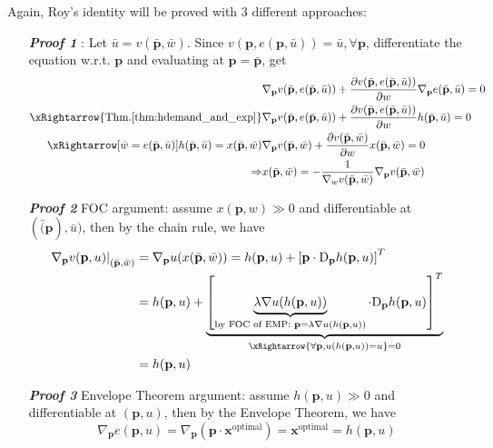 Again, Roy's identity will be proved with 3 different approaches:
\begin{enumerate}
    \item[\textit{\textbf{Proof 1}}]: Let $\bar{u} = v(\bar{\mathbf{p}},\bar{w})$. Since $v(\mathbf{p},e(\mathbf{p},\bar{u}))=\bar{u},\forall \mathbf{p}$, differentiate the equation w.r.t. $\mathbf{p}$ and evaluating at $\mathbf{p}=\bar{\mathbf{p}}$, get
    \begin{align*}
        & \nabla_{\mathbf{p}} v(\bar{\mathbf{p}},e(\bar{\mathbf{p}},\bar{u})) + \frac{\partial v(\bar{\mathbf{p}},e(\bar{\mathbf{p}},\bar{u}))}{\partial w} \nabla_{\mathbf{p}}e(\bar{\mathbf{p}},\bar{u})=0 \\
        \xRightarrow{\text{Thm.\ref{thm:hdemand_and_exp}}} & \nabla_{\mathbf{p}} v(\bar{\mathbf{p}},e(\bar{\mathbf{p}},\bar{u})) + \frac{\partial v(\bar{\mathbf{p}},e(\bar{\mathbf{p}},\bar{u}))}{\partial w} h(\bar{\mathbf{p}},\bar{u})=0\\
        \xRightarrow[\bar{w}=e(\bar{\mathbf{p}},\bar{u})]{h(\bar{\mathbf{p}},\bar{u})=x(\bar{\mathbf{p}},\bar{w})} & \nabla_{\mathbf{p}} v(\bar{\mathbf{p}},\bar{w}) + \frac{\partial v(\bar{\mathbf{p}},\bar{w})}{\partial w} x(\bar{\mathbf{p}},\bar{w})=0\\
        \Rightarrow & x(\bar{\mathbf{p}},\bar{w})=-\frac{1}{\nabla_w v(\bar{\mathbf{p}},\bar{w})}\nabla_{\mathbf{p}}v(\bar{\mathbf{p}},\bar{w})
    \end{align*}

    \item[\textit{\textbf{Proof 2}}] FOC argument: assume $x(\mathbf{p},w)\gg 0$ and differentiable at $(\bar(\mathbf{p}),\bar{u})$, then by the chain rule, we have 
    \begin{align*}
        \left.\nabla_{\mathbf{p}}v(\mathbf{p},u)\right\vert_{(\bar{\mathbf{p}},\bar{w})}&=\nabla_{\mathbf{p}} u(x(\bar{\mathbf{p}},\bar{w}))=h(\mathbf{p},u)+\left[\mathbf{p}\cdot \mathrm{D}_{\mathbf{p}}h(\mathbf{p},u)\right]^T\\
        &=h(\mathbf{p},u)+\underbrace{\left[\underbrace{\lambda\nabla u(h(\mathbf{p},u))}_{\text{by FOC of EMP: }\mathbf{p}=\lambda\nabla u(h(\mathbf{p},u))} \cdot \mathrm{D}_{\mathbf{p}}h(\mathbf{p},u)\right]^T}_{\xRightarrow{\forall \mathbf{p},u(h(\mathbf{p},u))=u}=0}\\
        & = h(\mathbf{p},u)
    \end{align*}
    \item[\textit{\textbf{Proof 3}}] Envelope Theorem argument: assume $h(\mathbf{p},u)\gg 0$ and differentiable at $(\mathbf{p},u)$, then by the Envelope Theorem, we have 
    $$\nabla_{\mathbf{p}}e(\mathbf{p},u)=\nabla_{\mathbf{p}}(\mathbf{p}\cdot \mathbf{x}^{\text{optimal}})=\mathbf{x}^{\text{optimal}}=h(\mathbf{p},u)$$
\end{enumerate}